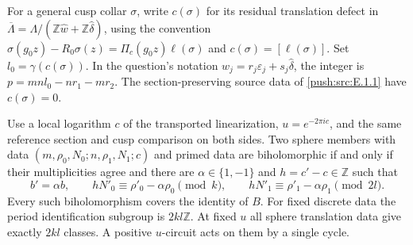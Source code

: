 For a general cusp collar $\sigma$, write $c(\sigma)$ for
its residual translation defect in
$\overline\Lambda=\Lambda/(\mathbb Z\widehat w+
\mathbb Z\widehat\delta)$, using the convention
$\sigma(g_0z)-R_0\sigma(z)=\Pi_c(g_0z)\ell(\sigma)$
and $c(\sigma)=[\ell(\sigma)]$.
Set $l_0=\gamma(c(\sigma))$.  In the question's notation
$w_j=r_j\varepsilon_j+s_j\widehat\delta$, the integer is
$p=mn l_0-nr_1-mr_2$.
The section-preserving source data of \ref{push:src:E.1.1} have $c(\sigma)=0$.

\begin{theorem}\label{push:src:E.1.2}
Use a local logarithm $c$ of the transported linearization,
$u=e^{-2\pi i c}$, and the same reference section and cusp comparison
on both sides.  Two sphere members with data
$(m,\rho_0,N_0;n,\rho_1,N_1;c)$ and primed data are biholomorphic
if and only if their multiplicities agree and there are
$\alpha\in\{1,-1\}$ and $h=c'-c\in\mathbb Z$ such that
\[
 b'=\alpha b,\qquad
 hN'_0\equiv\rho'_0-\alpha\rho_0\pmod{k},\qquad
 hN'_1\equiv\rho'_1-\alpha\rho_1\pmod{2l}.
\]
Every such biholomorphism covers the identity of $B$.
For fixed discrete data the period identification subgroup is
$2kl\mathbb Z$.  At fixed $u$ all sphere translation data give
exactly $2kl$ classes.  A positive $u$-circuit acts on them by a
single cycle.
\end{theorem}

